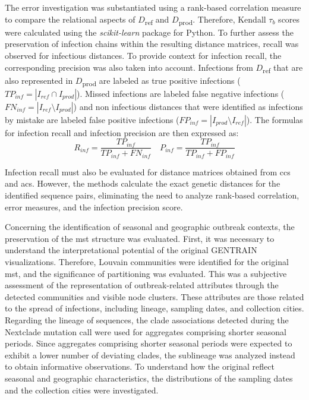 The error investigation was substantiated using a rank-based correlation measure to compare the relational aspects of $D$\textsubscript{ref} and $D$\textsubscript{prod}. Therefore, Kendall $\tau_b$ scores were calculated using the \textit{scikit-learn} package \cite{Sci1} for Python. To further assess the preservation of infection chains within the resulting distance matrices, recall was observed for infectious distances. To provide context for infection recall, the corresponding precision was also taken into account. Infections from $D$\textsubscript{ref} that are also represented in $D$\textsubscript{prod} are labeled as true positive infections ($TP_{inf} = |I_{ref} \cap I_{prod}|$). Missed infections are labeled false negative infections ($FN_{inf} = |I_{ref} \setminus I_{prod}|$) and non infectious distances that were identified as infections by mistake are labeled false positive infections ($FP_{inf} = |I_{prod} \setminus I_{ref}|$).
The formulas for infection recall and infection precision are then expressed as:
$$R_{inf} = \frac{TP_{inf}}{TP_{inf}+FN_{inf}} \quad P_{inf} = \frac{TP_{inf}}{TP_{inf}+FP_{inf}}$$

Infection recall must also be evaluated for distance matrices obtained from \acrshort{ccs} and \acrshort{acs}. However, the methods calculate the exact genetic distances for the identified sequence pairs, eliminating the need to analyze rank-based correlation, error measures, and the infection precision score.

Concerning the identification of seasonal and geographic outbreak contexts, the preservation of the \acrshort{mst} structure was evaluated. First, it was necessary to understand the interpretational potential of the original GENTRAIN visualizations. Therefore, Louvain communities were identified for the original \acrshort{mst}, and the significance of partitioning was evaluated. This was a subjective assessment of the representation of outbreak-related attributes through the detected communities and visible node clusters. These attributes are those related to the spread of infections, including lineage, sampling dates, and collection cities. Regarding the lineage of sequences, the clade associations detected during the Nextclade mutation call were used for aggregates comprising shorter seasonal periods. Since aggregates comprising shorter seasonal periods were expected to exhibit a lower number of deviating clades, the sublineage was analyzed instead to obtain informative observations. To understand how the original  reflect seasonal and geographic characteristics, the distributions of the sampling dates and the collection cities were investigated. 

